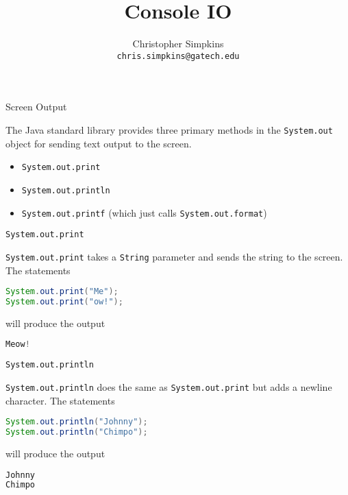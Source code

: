 \documentclass{beamer}
\title[CS 1331 Introduction to Object-Oriented Programming] %
{Console IO}
\subtitle{}
\author[Chris Simpkins] %
{Christopher Simpkins \\\texttt{chris.simpkins@gatech.edu}}
\institute[Georgia Tech] %
\date[] %
{}
\begin{document}
\begin{frame}
  \titlepage
\end{frame}


\begin{frame}[fragile]{Screen Output}


The Java standard library provides three primary methods in the {\tt System.out} object for sending text output to the screen.

\begin{itemize}
\item {\tt System.out.print} 
\item {\tt System.out.println} 
\item {\tt System.out.printf} (which just calls {\tt System.out.format})
\end{itemize}

\end{frame}

\begin{frame}[fragile]{{\tt System.out.print}}


{\tt System.out.print} takes a {\tt String} parameter and sends the string to the screen.  The statements
\begin{lstlisting}[language=Java]
System.out.print("Me");
System.out.print("ow!");
\end{lstlisting}
will produce the output
\begin{lstlisting}[language=Java]
Meow!
\end{lstlisting}

\end{frame}

\begin{frame}[fragile]{{\tt System.out.println}}


{\tt System.out.println} does the same as {\tt System.out.print} but adds a newline character.  The statements
\begin{lstlisting}[language=Java]
System.out.println("Johnny");
System.out.println("Chimpo");
\end{lstlisting}
will produce the output
\begin{lstlisting}[language=Java]
Johnny
Chimpo
\end{lstlisting}

\end{frame}
\end{document}
